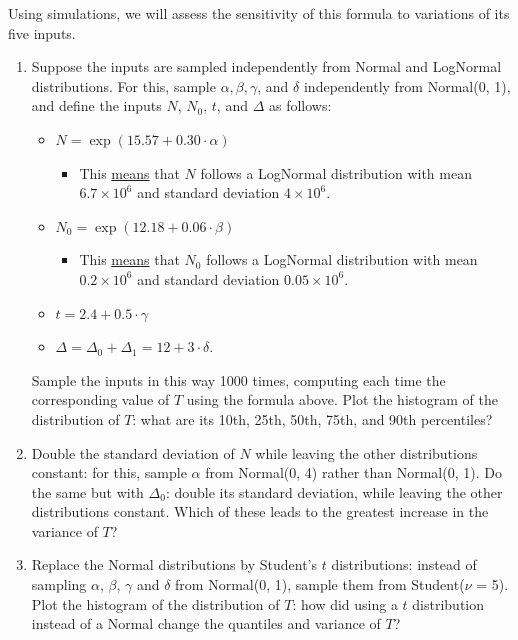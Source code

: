 \documentclass[11pt]{article}
\begin{document}
Using simulations, we will assess the sensitivity of this formula to variations of its five inputs.

\begin{enumerate}
	\item Suppose the inputs are sampled independently from Normal and LogNormal distributions. For this, sample $\alpha, \beta, \gamma$, and $\delta$ independently from Normal(0, 1), and define the inputs $N$, $N_0$, $t$, and $\Delta$ as follows:
	\begin{itemize}
		\item $N = \exp(15.57 + 0.30 \cdot \alpha)$ 
			\begin{itemize}
				\item This \href{https://www.johndcook.com/blog/2022/02/24/find-log-normal-parameters/}{means} that $N$ follows a LogNormal distribution with mean $6.7 \times 10^6$ and standard deviation $4 \times 10^6$.
			\end{itemize}
		\item $N_0 = \exp(12.18 + 0.06 \cdot \beta)$
			\begin{itemize}
				\item This \href{https://www.johndcook.com/blog/2022/02/24/find-log-normal-parameters/}{means} that $N_0$ follows a LogNormal distribution with mean $0.2 \times 10^6$ and standard deviation $0.05 \times 10^6$.
			\end{itemize}
		\item $t = 2.4 + 0.5 \cdot \gamma$
		\item $\Delta = \Delta_0 + \Delta_1 = 12 + 3 \cdot \delta$.
	\end{itemize}
	Sample the inputs in this way 1000 times, computing each time the corresponding value of $T$ using the formula above. Plot the histogram of the distribution of $T$: what are its 10th, 25th, 50th, 75th, and 90th percentiles?
	\item Double the standard deviation of $N$ while leaving the other distributions constant: for this, sample $\alpha$ from Normal(0, 4) rather than Normal(0, 1). Do the same but with $\Delta_0$: double its standard deviation, while leaving the other distributions constant. Which of these leads to the greatest increase in the variance of $T$?
	\item Replace the Normal distributions by Student's $t$ distributions: instead of sampling $\alpha$, $\beta$, $\gamma$ and $\delta$ from Normal(0, 1), sample them from Student($\nu$ = 5). Plot the histogram of the distribution of $T$: how did using a $t$ distribution instead of a Normal change the quantiles and variance of $T$? 

\end{enumerate}
\end{document}
